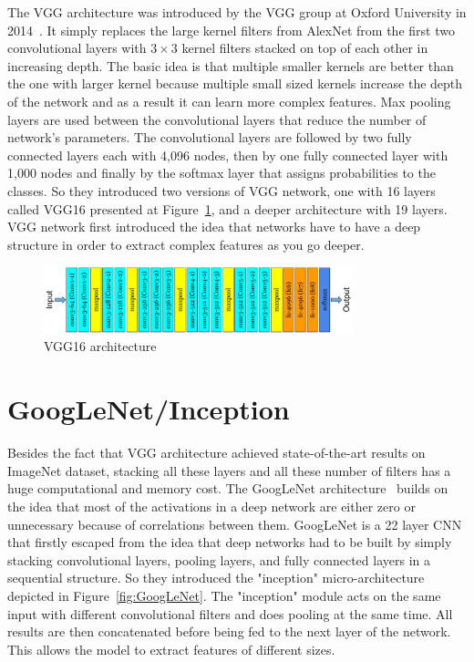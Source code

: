 The VGG architecture was introduced by the VGG group at Oxford University in 2014~\cite{simonyan2014very}. It simply replaces the large kernel filters from AlexNet from the first two convolutional layers with $3 \times 3$ kernel filters stacked on top of each other in increasing depth. The basic idea is that multiple smaller kernels are better than the one with larger kernel because multiple small sized kernels increase the depth of the network and as a result it can learn more complex features. Max pooling layers are used between the convolutional layers that reduce the number of network's parameters. The convolutional layers are followed by two fully connected layers each with 4,096 nodes, then by one fully connected layer with 1,000 nodes and finally by the softmax layer that assigns probabilities to the classes. So they introduced two versions of VGG network, one with 16 layers called VGG16 presented at Figure~\ref{fig:VGG16_imagenet}, and a deeper architecture with 19 layers. VGG network first introduced the idea that networks have to have a deep structure in order to extract complex features as you go deeper. 

\begin{figure}[]
    \begin{center}
    \includegraphics[width=0.8\textwidth]{images/VGG16_imagenet.pdf}
    \end{center}
    \caption{VGG16 architecture} \label{fig:VGG16_imagenet}
\end{figure}


\section{GoogLeNet/Inception}
Besides the fact that VGG architecture achieved state-of-the-art results on ImageNet dataset, stacking all these layers and all these number of filters has a huge computational and memory cost. The GoogLeNet architecture~\cite{szegedy2015going} builds on the idea that most of the activations in a deep network are either zero or unnecessary because of correlations between them. GoogLeNet is a 22 layer CNN that firstly escaped from the idea that deep networks had to be built by simply stacking convolutional layers, pooling layers, and fully connected layers in a sequential structure. So they introduced the "inception" micro-architecture depicted in Figure~\ref{fig:GoogLeNet}. The "inception" module acts on the same input with different convolutional filters and does pooling at the same time. All results are then concatenated before being fed to the next layer of the network. This allows the model to extract features of different sizes. 

